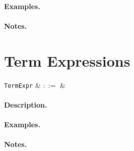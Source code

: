 \paragraph{Examples.}

\paragraph{Notes.} 


\section{Term Expressions}

\begin{syntax}
  \verb+TermExpr+ & $::=$ &\\
\end{syntax}

\paragraph{Description.}

\paragraph{Examples.}

\paragraph{Notes.} 



